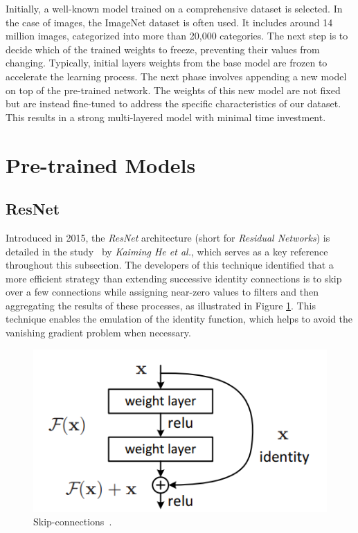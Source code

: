 Initially, a well-known model trained on a comprehensive dataset is selected. In the case of images, the ImageNet dataset is often used. It includes around 14 million images, categorized into more than 20,000 categories. The next step is to decide which of the trained weights to freeze, preventing their values from changing. Typically, initial layers weights from the base model are frozen to accelerate the learning process. The next phase involves appending a new model on top of the pre-trained network. The weights of this new model are not fixed but are instead fine-tuned to address the specific characteristics of our dataset. This results in a strong multi-layered model with minimal time investment.


\section{Pre-trained Models}
\label{sec:pretrainedModels}


\subsection{ResNet}

Introduced in 2015, the \textit{ResNet} architecture (short for \textit{Residual Networks}) is detailed in the study~\cite{DeepResidualLearning} by \textit{Kaiming He et al.}, which serves as a key reference throughout this subsection. The developers of this technique identified that a more efficient strategy than extending successive identity connections is to skip over a few connections while assigning near-zero values to filters and then aggregating the results of these processes, as illustrated in Figure \ref{fig:resNetSkipConnections}. This technique enables the emulation of the identity function, which helps to avoid the vanishing gradient problem when necessary.

\begin{figure}[!htb]
    \centering
    \includegraphics[scale=0.5]{Images/skip-connection.png}
    \caption{Skip-connections~\cite{DeepResidualLearning}.}
    \label{fig:resNetSkipConnections}
\end{figure}

